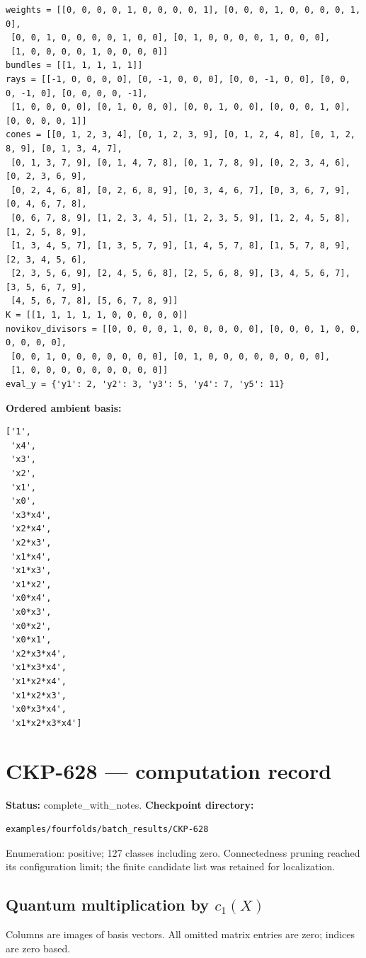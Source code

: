 \documentclass[10pt,a4paper]{article}
\begin{document}
\begin{lstlisting}
weights = [[0, 0, 0, 0, 1, 0, 0, 0, 0, 1], [0, 0, 0, 1, 0, 0, 0, 0, 1, 0],
 [0, 0, 1, 0, 0, 0, 0, 1, 0, 0], [0, 1, 0, 0, 0, 0, 1, 0, 0, 0],
 [1, 0, 0, 0, 0, 1, 0, 0, 0, 0]]
bundles = [[1, 1, 1, 1, 1]]
rays = [[-1, 0, 0, 0, 0], [0, -1, 0, 0, 0], [0, 0, -1, 0, 0], [0, 0, 0, -1, 0], [0, 0, 0, 0, -1],
 [1, 0, 0, 0, 0], [0, 1, 0, 0, 0], [0, 0, 1, 0, 0], [0, 0, 0, 1, 0], [0, 0, 0, 0, 1]]
cones = [[0, 1, 2, 3, 4], [0, 1, 2, 3, 9], [0, 1, 2, 4, 8], [0, 1, 2, 8, 9], [0, 1, 3, 4, 7],
 [0, 1, 3, 7, 9], [0, 1, 4, 7, 8], [0, 1, 7, 8, 9], [0, 2, 3, 4, 6], [0, 2, 3, 6, 9],
 [0, 2, 4, 6, 8], [0, 2, 6, 8, 9], [0, 3, 4, 6, 7], [0, 3, 6, 7, 9], [0, 4, 6, 7, 8],
 [0, 6, 7, 8, 9], [1, 2, 3, 4, 5], [1, 2, 3, 5, 9], [1, 2, 4, 5, 8], [1, 2, 5, 8, 9],
 [1, 3, 4, 5, 7], [1, 3, 5, 7, 9], [1, 4, 5, 7, 8], [1, 5, 7, 8, 9], [2, 3, 4, 5, 6],
 [2, 3, 5, 6, 9], [2, 4, 5, 6, 8], [2, 5, 6, 8, 9], [3, 4, 5, 6, 7], [3, 5, 6, 7, 9],
 [4, 5, 6, 7, 8], [5, 6, 7, 8, 9]]
K = [[1, 1, 1, 1, 1, 0, 0, 0, 0, 0]]
novikov_divisors = [[0, 0, 0, 0, 1, 0, 0, 0, 0, 0], [0, 0, 0, 1, 0, 0, 0, 0, 0, 0],
 [0, 0, 1, 0, 0, 0, 0, 0, 0, 0], [0, 1, 0, 0, 0, 0, 0, 0, 0, 0],
 [1, 0, 0, 0, 0, 0, 0, 0, 0, 0]]
eval_y = {'y1': 2, 'y2': 3, 'y3': 5, 'y4': 7, 'y5': 11}
\end{lstlisting}

\textbf{Ordered ambient basis:}
\begin{lstlisting}
['1',
 'x4',
 'x3',
 'x2',
 'x1',
 'x0',
 'x3*x4',
 'x2*x4',
 'x2*x3',
 'x1*x4',
 'x1*x3',
 'x1*x2',
 'x0*x4',
 'x0*x3',
 'x0*x2',
 'x0*x1',
 'x2*x3*x4',
 'x1*x3*x4',
 'x1*x2*x4',
 'x1*x2*x3',
 'x0*x3*x4',
 'x1*x2*x3*x4']
\end{lstlisting}

\clearpage\section*{CKP-628 --- computation record}
\textbf{Status:} complete\_with\_notes.
\textbf{Checkpoint directory:}
\begin{lstlisting}
examples/fourfolds/batch_results/CKP-628
\end{lstlisting}

Enumeration: positive; 127 classes including zero.
Connectedness pruning reached its configuration limit; the finite candidate list was retained for localization.
\subsection*{Quantum multiplication by $c_1(X)$}
Columns are images of basis vectors. All omitted matrix entries are zero; indices are zero based.
\end{document}
